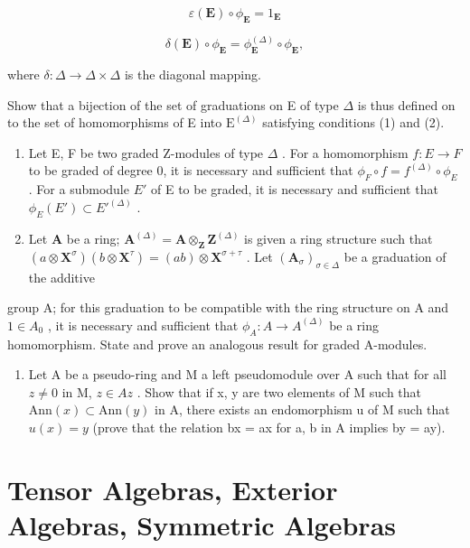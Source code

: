 \[
\varepsilon (\mathbf {E}) \circ \phi_ {\mathbf {E}} = 1 _ {\mathbf {E}}\tag{1}
\]

\[
\delta (\mathbf {E}) \circ \phi_ {\mathbf {E}} = \phi_ {\mathbf {E}} ^ {(\Delta)} \circ \phi_ {\mathbf {E}},\tag{2}
\]

where \(\delta: \Delta \to \Delta \times \Delta\) is the diagonal mapping.

Show that a bijection of the set of graduations on E of type \(\Delta\) is thus defined on to the set of homomorphisms of E into \(\mathrm{E}^{(\Delta)}\) satisfying conditions (1) and (2).

\begin{enumerate}
\def\labelenumi{(\alph{enumi})}
\setcounter{enumi}{1}
\item
  Let E, F be two graded Z-modules of type \(\Delta\) . For a homomorphism \(f: E \to F\) to be graded of degree 0, it is necessary and sufficient that \(\phi_{F} \circ f = f^{(\Delta)} \circ \phi_{E}\) . For a submodule \(E'\) of E to be graded, it is necessary and sufficient that \(\phi_{E}(E') \subset E'^{(\Delta)}\) .
\item
  Let \(\mathbf{A}\) be a ring; \(\mathbf{A}^{(\Delta)} = \mathbf{A} \otimes_{\mathbf{Z}} \mathbf{Z}^{(\Delta)}\) is given a ring structure such that \((a \otimes \mathbf{X}^{\sigma})(b \otimes \mathbf{X}^{\tau}) = (ab) \otimes \mathbf{X}^{\sigma + \tau}\) . Let \((\mathbf{A}_{\sigma})_{\sigma \in \Delta}\) be a graduation of the additive
\end{enumerate}

group A; for this graduation to be compatible with the ring structure on A and \(1 \in A_{0}\) , it is necessary and sufficient that \(\phi_{A}: A \to A^{(\Delta)}\) be a ring homomorphism. State and prove an analogous result for graded A-modules.

\BourbakiAppendixExercises

\begin{enumerate}
\def\labelenumi{\arabic{enumi}.}
\tightlist
\item
  Let A be a pseudo-ring and M a left pseudomodule over A such that for all \(z \neq 0\) in M, \(z \in Az\) . Show that if x, y are two elements of M such that \(\text{Ann}(x) \subset \text{Ann}(y)\) in A, there exists an endomorphism u of M such that \(u(x) = y\) (prove that the relation bx = ax for a, b in A implies by = ay).
\end{enumerate}

\chapter{Tensor Algebras, Exterior Algebras, Symmetric Algebras}

